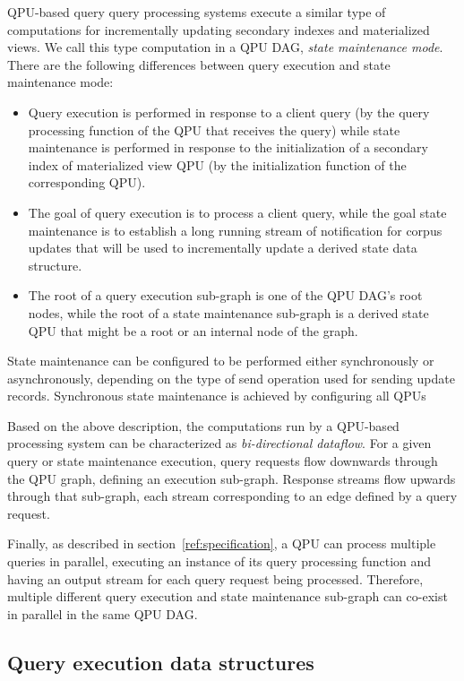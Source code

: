 \medskip
QPU-based query query processing systems execute a similar type of computations for incrementally updating
secondary indexes and materialized views.
We call this type computation in a QPU DAG, \textit{state maintenance mode}.
There are the following differences between query execution and state maintenance mode:
\begin{itemize}
  \item Query execution is performed in response to a client query (by the query processing function of the QPU that receives the query)
  while state maintenance is performed in response to the initialization of a secondary index of materialized view QPU
  (by the initialization function of the corresponding QPU).
  \item The goal of query execution is to process a client query,
  while the goal state maintenance is to establish a long running stream of notification for corpus updates that
  will be used to incrementally update a derived state data structure.
  \item The root of a query execution sub-graph is one of the QPU DAG's root nodes,
  while the root of a state maintenance sub-graph is a derived state QPU that might be a root or an internal node of the
  graph.
\end{itemize}

\medskip
\noindent
State maintenance can be configured to be performed either synchronously or asynchronously, depending on the type of send
operation used for sending update records.
Synchronous state maintenance is achieved by configuring all QPUs 

\medskip
\noindent
Based on the above description, the computations run by a QPU-based processing system can be characterized as
\textit{bi-directional dataflow}.
For a given query or state maintenance execution,
query requests flow downwards through the QPU graph, defining an execution sub-graph.
Response streams flow upwards through that sub-graph, each stream corresponding to an edge defined by a query request.

\medskip
\noindent
Finally, as described in section~\ref{ref:specification}, a QPU can process multiple queries in parallel,
executing an instance of its query processing function and having an output stream for each query request being processed.
Therefore, multiple different query execution and state maintenance sub-graph can co-exist in parallel in the same QPU DAG.


\subsection{Query execution data structures}

